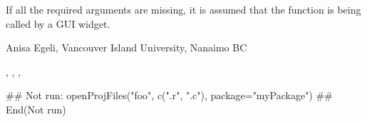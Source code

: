 \documentclass[letterpaper]{book}
\begin{document}
\begin{Note}\relax
If all the required arguments are missing, it is assumed that the 
function is being called by a GUI widget.
\end{Note}
\begin{Author}\relax
Anisa Egeli, Vancouver Island University, Nanaimo BC
\end{Author}
\begin{SeeAlso}\relax
{}, , ,
\end{SeeAlso}
\begin{Examples}
\begin{ExampleCode}
## Not run: 
openProjFiles("foo", c(".r", ".c"), package="myPackage")
## End(Not run)
\end{ExampleCode}
\end{Examples}
\end{document}

